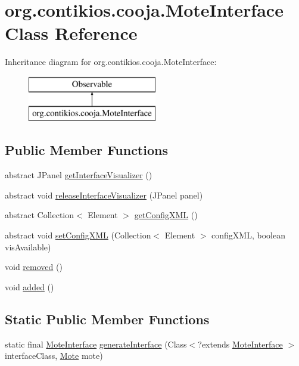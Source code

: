 \hypertarget{classorg_1_1contikios_1_1cooja_1_1MoteInterface}{\section{org.\-contikios.\-cooja.\-Mote\-Interface Class Reference}
\label{classorg_1_1contikios_1_1cooja_1_1MoteInterface}
}
Inheritance diagram for org.\-contikios.\-cooja.\-Mote\-Interface\-:\begin{figure}[H]
\begin{center}
\leavevmode
\includegraphics[height=2.000000cm]{classorg_1_1contikios_1_1cooja_1_1MoteInterface}
\end{center}
\end{figure}
\subsection*{Public Member Functions}
\begin{DoxyCompactItemize}
\item 
abstract J\-Panel \hyperlink{classorg_1_1contikios_1_1cooja_1_1MoteInterface_aec9b47d1b1a2f468eebb96b803608673}{get\-Interface\-Visualizer} ()
\item 
abstract void \hyperlink{classorg_1_1contikios_1_1cooja_1_1MoteInterface_a4f50d1a74a9cd0eac4ef28383869223e}{release\-Interface\-Visualizer} (J\-Panel panel)
\item 
abstract Collection$<$ Element $>$ \hyperlink{classorg_1_1contikios_1_1cooja_1_1MoteInterface_a36e4f41f720be08a8a04ec46a7184af1}{get\-Config\-X\-M\-L} ()
\item 
abstract void \hyperlink{classorg_1_1contikios_1_1cooja_1_1MoteInterface_a9b589b6bcc6687a0c4c1a473b4ef5723}{set\-Config\-X\-M\-L} (Collection$<$ Element $>$ config\-X\-M\-L, boolean vis\-Available)
\item 
void \hyperlink{classorg_1_1contikios_1_1cooja_1_1MoteInterface_af67ea5b5ccab50b236edf962bd4e600a}{removed} ()
\item 
void \hyperlink{classorg_1_1contikios_1_1cooja_1_1MoteInterface_afb51b7574cfc11ed6aa790ea9ff09344}{added} ()
\end{DoxyCompactItemize}
\subsection*{Static Public Member Functions}
\begin{DoxyCompactItemize}
\item 
static final \hyperlink{classorg_1_1contikios_1_1cooja_1_1MoteInterface}{Mote\-Interface} \hyperlink{classorg_1_1contikios_1_1cooja_1_1MoteInterface_af714a0ccfd23c543e3ed412dac6b317f}{generate\-Interface} (Class$<$?extends \hyperlink{classorg_1_1contikios_1_1cooja_1_1MoteInterface}{Mote\-Interface} $>$ interface\-Class, \hyperlink{interfaceorg_1_1contikios_1_1cooja_1_1Mote}{Mote} mote)
\end{DoxyCompactItemize}


